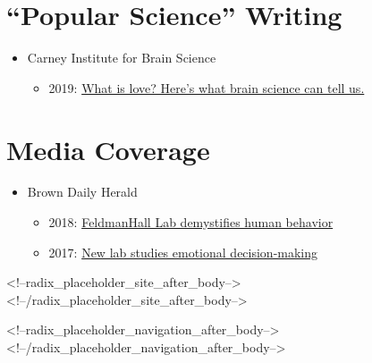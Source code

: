 \documentclass[
]{article}
\providecommand{\tightlist}{%
  \setlength{\itemsep}{0pt}\setlength{\parskip}{0pt}}
\begin{document}
\hypertarget{popular-science-writing}{%
\section{``Popular Science'' Writing}\label{popular-science-writing}}

\begin{itemize}
\item
  Carney Institute for Brain Science

  \begin{itemize}
  \tightlist
  \item
    2019:
    \href{https://www.brown.edu/carney/news/2019/02/13/what-love-here\%E2\%80\%99s-what-brain-science-can-tell-us}{What
    is love? Here's what brain science can tell us.}
  \end{itemize}
\end{itemize}

\hypertarget{media-coverage}{%
\section{Media Coverage}\label{media-coverage}}

\begin{itemize}
\item
  Brown Daily Herald

  \begin{itemize}
  \tightlist
  \item
    2018:
    \href{https://www.browndailyherald.com/2018/09/17/feldmanhall-lab-demystifies-human-behavior/}{FeldmanHall
    Lab demystifies human behavior}
  \item
    2017:
    \href{https://www.browndailyherald.com/2017/02/06/new-lab-studies-emotional-decision-making/}{New
    lab studies emotional decision-making}
  \end{itemize}
\end{itemize}

<!--radix_placeholder_site_after_body-->
<!--/radix_placeholder_site_after_body-->

<!--radix_placeholder_navigation_after_body-->
<!--/radix_placeholder_navigation_after_body-->
\end{document}
